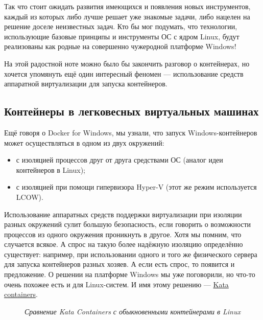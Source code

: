 \documentclass[14pt, a4paper]{article}
\begin{document}
Так что стоит ожидать развития имеющихся и появления новых инструментов, каждый из которых
либо лучше решает уже знакомые задачи, либо нацелен на решение доселе неизвестных задач. Кто
бы мог подумать, что технологии, использующие базовые принципы и инструменты ОС с ядром Linux,
будут реализованы как родные на совершенно чужеродной платформе Windows!

На этой радостной ноте можно было бы закончить разговор о контейнерах, но хочется упомянуть ещё
один интересный феномен — использование средств аппаратной виртуализации для запуска
контейнеров.

\subsection*{Контейнеры в легковесных виртуальных машинах}

Ещё говоря о Docker for Windows, мы узнали, что запуск Windows-контейнеров может осуществляться
в одном из двух окружений:

\begin{itemize}
    \item с изоляцией процессов друг от друга средствами ОС (аналог идеи контейнеров в Linux);
    \item с изоляцией при помощи гипервизора Hyper-V (этот же режим используется LCOW).
\end{itemize}

Использование аппаратных средств поддержки виртуализации при изоляции разных окружений сулит
большую безопасность, если говорить о возможности процессов из одного окружения проникнуть в
другое. Хотя мы помним, что случается всякое. А спрос на такую более надёжную изоляцию
определённо существует: например, при использовании одного и того же физического сервера для
запуска контейнеров разных хозяев. А если есть спрос, то появится и предложение. О решении на
платформе Windows мы уже поговорили, но что-то очень похожее есть и для Linux-систем. И имя
этому решению — \href{https://katacontainers.io/}{Kata containers}.

\begin{figure}[h]
    \centering
    \caption*{\textit{Сравнение Kata Containers с обыкновенными контейнерами в Linux}}
    \label{3.8}
\end{figure}
\end{document}
